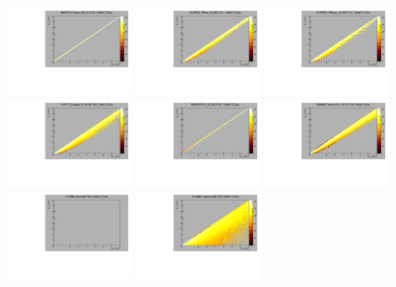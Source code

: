 \begin{center}

  \includegraphics[width=0.245\textwidth]{plots/response_matrix/Proton_KE_FHC_CCInc_10MeV.pdf}
  \includegraphics[width=0.245\textwidth]{plots/response_matrix/PiPlus_KE_FHC_CCInc_10MeV.pdf}
  \includegraphics[width=0.245\textwidth]{plots/response_matrix/PiMinus_KE_FHC_CCInc_10MeV.pdf}
  \includegraphics[width=0.245\textwidth]{plots/response_matrix/Charged_Pi_KE_FHC_CCInc_10MeV.pdf}
  \includegraphics[width=0.245\textwidth]{plots/response_matrix/Pi0_KE_FHC_CCInc_10MeV.pdf}
  \includegraphics[width=0.245\textwidth]{plots/response_matrix/Proton+Pion_KE_FHC_CCInc_10MeV.pdf}
  \includegraphics[width=0.245\textwidth]{plots/response_matrix/Total_FHC_CCInc_10MeV.pdf}
  \includegraphics[width=0.245\textwidth]{plots/response_matrix/Hadrons_FHC_CCInc_10MeV.pdf}

\end{center}

